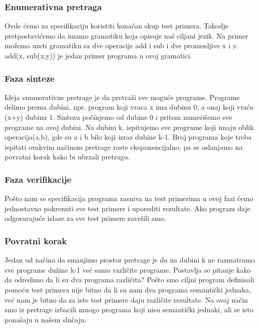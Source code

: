 \subsubsection{Enumerativna pretraga}
\label{subsec:enumerativnaPretragaCegis}

Ovde ćemo za specifikaciju koristiti konačan skup test primera. Takodje pretpostavićemo da imamo gramatiku koja opisuje naš ciljani jezik. Na primer možemo uzeti gramatiku sa dve operacije add i sub i dve promenljive x i y. add(x, sub(x,y)) je jedan primer programa u ovoj gramatici.

\subsubsection*{Faza sinteze}

Ideja enumerativne pretrage je da pretraži sve moguće programe. Programe delimo prema dubini, npr. program koji vraca x ima dubinu 0, a onaj koji vraća (x+y) dubinu 1.
Sintezu počinjemo od dubine 0 i pritom numerišemo sve programe na ovoj dubini. Na dubini k, ispitujemo sve programe koji imaju oblik operacija(a,b), gde su a i b bilo koji izraz dubine k-1. Broj programa koje treba ispitati ovakvim načinom pretrage raste eksponencijalno, pa se oslanjamo na povratni korak kako bi ubrzali pretragu.

\subsubsection*{Faza verifikacije}
Pošto nam se specifikacija programa zasniva na test primerima u ovoj fazi ćemo jednostavno pokrenuti sve test primere i uporediti rezultate. Ako program daje odgovarajuće izlaze za sve test primere završili smo.

\subsubsection*{Povratni korak}

Jedan od načina da smanjimo prostor pretrage je da na dubini k ne razmatramo sve programe dužine k-1 već samo različite programe. Postavlja se pitanje kako da odredimo da li su dva programa različita? Pošto smo ciljni program definisali pomoću test primera nije bitno da li su nam dva programa semantički jednaka, već nam je bitno da  za iste test primere daju različite rezultate. Na ovaj način smo iz pretrage izbacili mnogo programa koji nisu
semantički jednaki, ali se isto ponašaju u našem slučaju.
